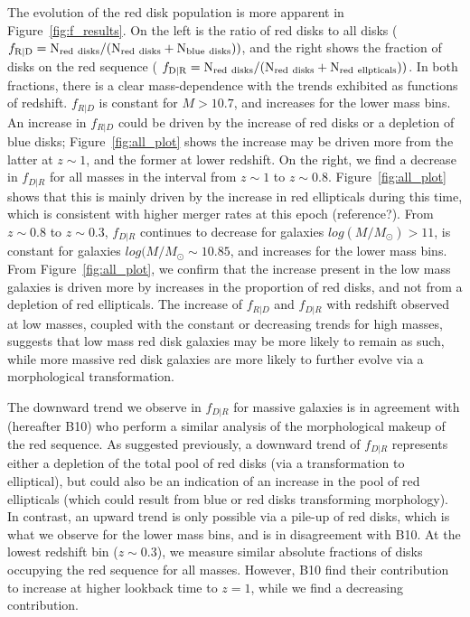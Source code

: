 \documentclass[useAMS,usenatbib]{mn2e}
\begin{document}
The evolution of the red disk population is more apparent in Figure~\ref{fig:f_results}. On the left is the ratio of red disks to all disks ($f_{\rm R|D} = \rm N_{\rm red~disks}/(N_{\rm red~disks}+N_{\rm blue~disks}))$, and the right shows the fraction of disks on the red sequence ( $f_{\rm D|R} = \rm N_{\rm red~disks}/(N_{\rm red~disks}+N_{\rm red~ellpticals}))$. In both fractions, there is a clear mass-dependence with the trends exhibited as functions of redshift. $f_{R|D}$ is constant for $M>10.7$, and increases for the lower mass bins. An increase in $f_{R|D}$ could be driven by the increase of red disks or a depletion of blue disks; Figure~\ref{fig:all_plot} shows the increase may be driven more from the latter at $z\sim1$, and the former at lower redshift. On the right, we find a decrease in $f_{D|R}$ for all masses in the interval from $z\sim1$ to $z\sim0.8$. Figure~\ref{fig:all_plot} shows that this is mainly driven by the increase in red ellipticals during this time, which is consistent with higher merger rates at this epoch (reference?). From $z\sim0.8$ to $z\sim0.3$, $f_{D|R}$ continues to decrease for galaxies $log(M/M_{\odot})>11$, is constant for galaxies $log(M/M_{\odot}\sim10.85$, and increases for the lower mass bins. From Figure~\ref{fig:all_plot}, we confirm that the increase present in the low mass galaxies is driven more by increases in the proportion of red disks, and not from a depletion of red ellipticals. The increase of $f_{R|D}$ and $f_{D|R}$ with redshift observed at low masses, coupled with the constant or decreasing trends for high masses, suggests that low mass red disk galaxies may be more likely to remain as such, while more massive red disk galaxies are more likely to further evolve via a morphological transformation. 

The downward trend we observe in $f_{D|R}$ for massive galaxies is in agreement with \citet{Bundy2010} (hereafter B10) who perform a similar analysis of the morphological makeup of the red sequence. As suggested previously, a downward trend of $f_{D|R}$ represents either a depletion of the total pool of red disks (via a transformation to elliptical), but could also be an indication of an increase in the pool of red ellipticals (which could result from blue or red disks transforming morphology). In contrast, an upward trend is only possible via a pile-up of red disks, which is what we observe for the lower mass bins, and is in disagreement with B10. At the lowest redshift bin ($z\sim0.3$), we measure similar absolute fractions of disks occupying the red sequence for all masses. However, B10 find their contribution to increase at higher lookback time to $z=1$, while we find a decreasing contribution. 
\end{document}
